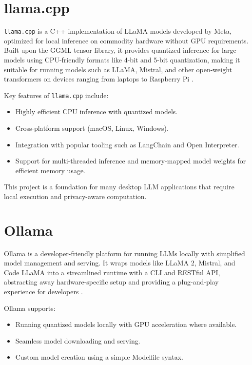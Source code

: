 \section{llama.cpp}
\label{sec:llama_cpp}

\texttt{llama.cpp} is a C++ implementation of LLaMA models developed by Meta, optimized for local inference on commodity hardware without GPU requirements. Built upon the GGML tensor library, it provides quantized inference for large models using CPU-friendly formats like 4-bit and 5-bit quantization, making it suitable for running models such as LLaMA, Mistral, and other open-weight transformers on devices ranging from laptops to Raspberry Pi \cite{llamacpp}.

Key features of \texttt{llama.cpp} include:
\begin{itemize}
    \item Highly efficient CPU inference with quantized models.
    \item Cross-platform support (macOS, Linux, Windows).
    \item Integration with popular tooling such as LangChain and Open Interpreter.
    \item Support for multi-threaded inference and memory-mapped model weights for efficient memory usage.
\end{itemize}

This project is a foundation for many desktop LLM applications that require local execution and privacy-aware computation.


\section{Ollama}
\label{sec:ollama}

Ollama is a developer-friendly platform for running LLMs locally with simplified model management and serving. It wraps models like LLaMA 2, Mistral, and Code LLaMA into a streamlined runtime with a CLI and RESTful API, abstracting away hardware-specific setup and providing a plug-and-play experience for developers \cite{ollama}.

Ollama supports:
\begin{itemize}
    \item Running quantized models locally with GPU acceleration where available.
    \item Seamless model downloading and serving.
    \item Custom model creation using a simple Modelfile syntax.
\end{itemize}

